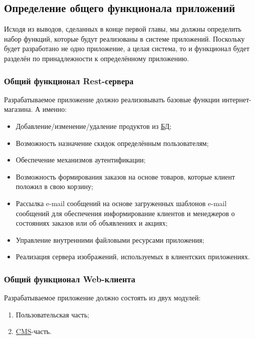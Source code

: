 \subsection{Определение общего функционала приложений}\label{subsec:2-define-functionality}\indent

Исходя из выводов, сделанных в конце первой главы, мы должны определить набор функций, которые будут реализованы в системе приложений.
Поскольку будет разработано не одно приложение, а целая система, то и функционал будет разделён по принадлежности к определённому приложению.

\subsubsection{Общий функционал Rest-сервера}\indent

Разрабатываемое приложение должно реализовывать базовые функции интернет-магазина.
А именно:

\begin{itemize}
    \item Добавление/изменение/удаление продуктов из \hyperlink{gloss:db}{БД};
    \item Возможность назначение скидок определённым пользователям;
    \item Обеспечение механизмов аутентификации;
    \item Возможность формирования заказов на основе товаров, которые клиент положил в свою корзину;
    \item Рассылка e-mail сообщений на основе загруженных шаблонов e-mail сообщений для обеспечения информирование клиентов и менеджеров о состояниях заказов или об объявлениях и акциях;
    \item Управление внутренними файловыми ресурсами приложения;
    \item Реализация сервера изображений, используемых в клиентских приложениях.
\end{itemize}

\subsubsection{Общий функционал Web-клиента}\indent

Разрабатываемое приложение должно состоять из двух модулей:

\begin{enumerate}
    \item Пользовательская часть;
    \item \hyperlink{gloss:cms}{CMS}-часть.
\end{enumerate}

